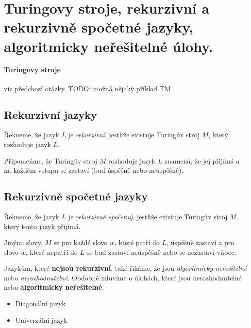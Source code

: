 \section[TAL - Turingovy stroje]{Turingovy stroje, rekurzivní a rekurzivně spočetné jazyky, algoritmicky neřešitelné úlohy.}

\paragraph{Turingovy stroje} viz předchozí otázky. TODO: možná nějaký příklad TM

\subsection{Rekurzivní jazyky}
Řekneme, že jazyk $L$ je \textit{rekurzivní}, jestliže existuje Turingův stroj $M$, který rozhoduje jazyk $L$.

Připomeńme, že Turingův stroj $M$ rozhoduje jazyk $L$ znamená, že jej přijímá a na každém vstupu se zastaví (buď úspěšně nebo neúspěšně).

\subsection{Rekurzivně spočetné jazyky}
Řekneme, že jazyk $L$ je \textit{rekurzivně spočetný}, jestliže existuje Turingův stroj $M$, který tento jazyk přijímá.

Jinými slovy, $M$ se pro každé slovo $w$, které patří do $L$, úspěšně zastaví a pro slovo $w$, které nepatří do $L$ se buď zastaví neúspěšně nebo se nezastaví vůbec.

Jazykům, které \textbf{nejsou rekurzivní}, také říkáme, že jsou \textit{algoritmicky neřešitelné} nebo \textit{nerozhodnutelné}. Obdobně mluvíme o úlohách, které jsou nerozhodnutelné nebo \textbf{algoritmicky neřešitelné}.

\begin{itemize}
\item Diagonální jazyk
\item Univerzální jazyk
\end{itemize}
